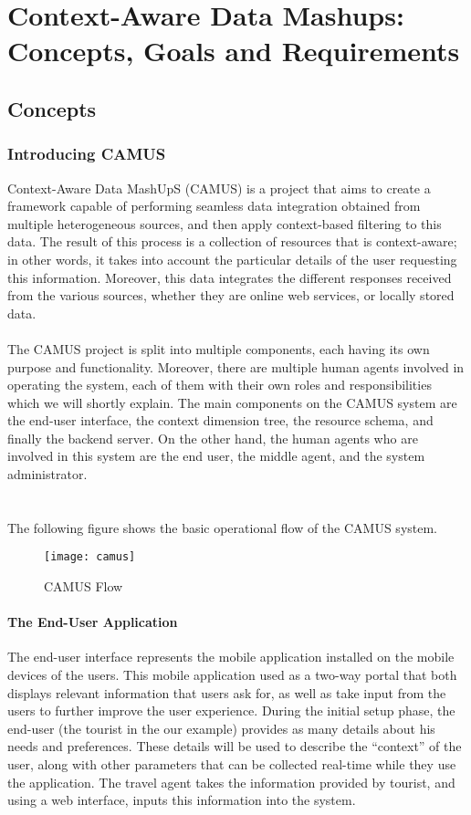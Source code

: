 \chapter{Context-Aware Data Mashups: Concepts, Goals and Requirements}
\label{capitolo3}
\thispagestyle{empty}

\section{Concepts}
\subsection{Introducing CAMUS}
Context-Aware Data MashUpS (CAMUS) is a project that aims to create a framework capable of performing seamless data integration obtained from multiple heterogeneous sources, and then apply context-based filtering to this data. The result of this process is a collection of resources that is context-aware; in other words, it takes into account the particular details of the user requesting this information. Moreover, this data integrates the different responses received from the various sources, whether they are online web services, or locally stored data.\\\\
The CAMUS project is split into multiple components, each having its own purpose and functionality. Moreover, there are multiple human agents involved in operating the system, each of them with their own roles and responsibilities which we will shortly explain. The main components on the CAMUS system are the end-user interface, the context dimension tree, the resource schema, and finally the backend server. On the other hand, the human agents who are involved in this system are the end user, the middle agent, and the system administrator.\\\\\\
The following figure shows the basic operational flow of the CAMUS system.
\begin{figure}[h]
\texttt{[image: camus]}
\caption{CAMUS Flow}
\end{figure}
\subsubsection{The End-User Application}
The end-user interface represents the mobile application installed on the mobile devices of the users. This mobile application used as a two-way portal that both displays relevant information that users ask for, as well as take input from the users to further improve the user experience. During the initial setup phase, the end-user (the tourist in the our example) provides as many details about his needs and preferences. These details will be used to describe the ``context'' of the user, along with other parameters that can be collected real-time while they use the application. The travel agent takes the information provided by tourist, and using a web interface, inputs this information into the system.
